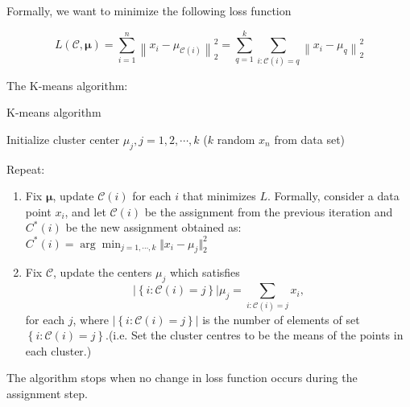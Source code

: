 \documentclass{article}
\begin{document}
Formally, we want to minimize the following loss function

$$
L(\mathcal{C}, \boldsymbol{\mu})=\sum_{i=1}^n\left\|x_i-\mu_{\mathcal{C}(i)}\right\|_2^2 = \sum_{q=1}^{k}\sum_{i:\mathcal{C}(i)=q}\left\|x_i-\mu_{q}\right\|_2^2
$$

The K-means algorithm:
\begin{algorithm}
\caption{K-means algorithm}

Initialize cluster center $\mu_j, j = 1, 2, \cdots, k$ ($k$ random $x_n$ from data set)

Repeat:
\begin{enumerate}
    \item Fix $\boldsymbol{\mu}$, update $\mathcal{C}(i)$ for each $i$ that minimizes $L$. Formally, consider a data point $x_i$, and let $\mathcal{C}(i)$ be the  assignment from the previous iteration and $C^*(i)$ be the new assignment obtained as: $C^*(i)= \arg\min_{j=1, \cdots, k} \Vert x_i - \mu_j\Vert^2_2$

    \item Fix $\mathcal{C}$, update the centers $\mu_j$ which satisfies 
$$\left|\left\{i: \mathcal{C}(i)=j\right\}\right|\mu_j= 
\sum_{i: \mathcal{C}(i)=j} x_i, 
$$for each $j$, where $\left|\left\{i: \mathcal{C}(i)=j\right\}\right|$ is the number of elements of set $\left\{i: \mathcal{C}(i)=j\right\}$.(i.e. Set the cluster centres to be the means of the points in each cluster.)

\end{enumerate}
\end{algorithm}

The algorithm stops when no change in loss function occurs during the assignment step.
\end{document}
